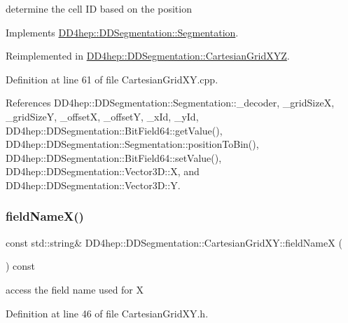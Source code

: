 determine the cell ID based on the position 



Implements \hyperlink{class_d_d4hep_1_1_d_d_segmentation_1_1_segmentation_ad5a60953d96d409850d8192f64f8ce3c}{D\+D4hep\+::\+D\+D\+Segmentation\+::\+Segmentation}.



Reimplemented in \hyperlink{class_d_d4hep_1_1_d_d_segmentation_1_1_cartesian_grid_x_y_z_acc3af2f1d41a94cbb5bb965e8572096a}{D\+D4hep\+::\+D\+D\+Segmentation\+::\+Cartesian\+Grid\+X\+YZ}.



Definition at line 61 of file Cartesian\+Grid\+X\+Y.\+cpp.



References D\+D4hep\+::\+D\+D\+Segmentation\+::\+Segmentation\+::\+\_\+decoder, \+\_\+grid\+SizeX, \+\_\+grid\+SizeY, \+\_\+offsetX, \+\_\+offsetY, \+\_\+x\+Id, \+\_\+y\+Id, D\+D4hep\+::\+D\+D\+Segmentation\+::\+Bit\+Field64\+::get\+Value(), D\+D4hep\+::\+D\+D\+Segmentation\+::\+Segmentation\+::position\+To\+Bin(), D\+D4hep\+::\+D\+D\+Segmentation\+::\+Bit\+Field64\+::set\+Value(), D\+D4hep\+::\+D\+D\+Segmentation\+::\+Vector3\+D\+::X, and D\+D4hep\+::\+D\+D\+Segmentation\+::\+Vector3\+D\+::Y.

\hypertarget{class_d_d4hep_1_1_d_d_segmentation_1_1_cartesian_grid_x_y_a07b3b5a48c84b4a394a27c45956146a0}{}\label{class_d_d4hep_1_1_d_d_segmentation_1_1_cartesian_grid_x_y_a07b3b5a48c84b4a394a27c45956146a0} 
\subsubsection{\texorpdfstring{field\+Name\+X()}{fieldNameX()}}
{\footnotesize\ttfamily const std\+::string\& D\+D4hep\+::\+D\+D\+Segmentation\+::\+Cartesian\+Grid\+X\+Y\+::field\+NameX (\begin{DoxyParamCaption}{ }\end{DoxyParamCaption}) const\hspace{0.3cm}{\ttfamily [inline]}}



access the field name used for X 



Definition at line 46 of file Cartesian\+Grid\+X\+Y.\+h.



